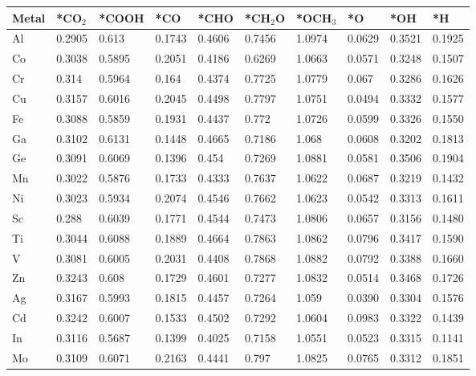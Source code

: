 \begin{table}[h]
  \centering
  {\fontsize{6}{12}\selectfont
  \begin{tabular}{*{10}{l}}
    \hline
    Metal & *CO$_2$ & *COOH & *CO & *CHO   & *CH$_2$O & *OCH$_3$ & *O & *OH    & *H     \\
    \hline
    Al & 0.2905 & 0.613  & 0.1743 & 0.4606 & 0.7456 & 1.0974 & 0.0629 & 0.3521 & 0.1925 \\
    Co & 0.3038 & 0.5895 & 0.2051 & 0.4186 & 0.6269 & 1.0663 & 0.0571 & 0.3248 & 0.1507 \\
    Cr & 0.314  & 0.5964 & 0.164  & 0.4374 & 0.7725 & 1.0779 & 0.067  & 0.3286 & 0.1626 \\
    Cu & 0.3157 & 0.6016 & 0.2045 & 0.4498 & 0.7797 & 1.0751 & 0.0494 & 0.3332 & 0.1577 \\
    Fe & 0.3088 & 0.5859 & 0.1931 & 0.4437 & 0.772  & 1.0726 & 0.0599 & 0.3326 & 0.1550 \\
    Ga & 0.3102 & 0.6131 & 0.1448 & 0.4665 & 0.7186 & 1.068  & 0.0608 & 0.3202 & 0.1813 \\
    Ge & 0.3091 & 0.6069 & 0.1396 & 0.454  & 0.7269 & 1.0881 & 0.0581 & 0.3506 & 0.1904 \\
    Mn & 0.3022 & 0.5876 & 0.1733 & 0.4333 & 0.7637 & 1.0622 & 0.0687 & 0.3219 & 0.1432 \\
    Ni & 0.3023 & 0.5934 & 0.2074 & 0.4546 & 0.7662 & 1.0623 & 0.0542 & 0.3313 & 0.1611 \\
    Sc & 0.288  & 0.6039 & 0.1771 & 0.4544 & 0.7473 & 1.0806 & 0.0657 & 0.3156 & 0.1480 \\
    Ti & 0.3044 & 0.6088 & 0.1889 & 0.4664 & 0.7863 & 1.0862 & 0.0796 & 0.3417 & 0.1590 \\
    V  & 0.3081 & 0.6005 & 0.2031 & 0.4408 & 0.7868 & 1.0882 & 0.0792 & 0.3388 & 0.1660 \\
    Zn & 0.3243 & 0.608  & 0.1729 & 0.4601 & 0.7277 & 1.0832 & 0.0514 & 0.3468 & 0.1726 \\
    Ag & 0.3167 & 0.5993 & 0.1815 & 0.4457 & 0.7264 & 1.059  & 0.0390 & 0.3304 & 0.1576 \\
    Cd & 0.3242 & 0.6007 & 0.1533 & 0.4502 & 0.7292 & 1.0604 & 0.0983 & 0.3322 & 0.1439 \\
    In & 0.3116 & 0.5687 & 0.1399 & 0.4025 & 0.7158 & 1.0551 & 0.0523 & 0.3315 & 0.1141 \\
    Mo & 0.3109 & 0.6071 & 0.2163 & 0.4441 & 0.797  & 1.0825 & 0.0765 & 0.3312 & 0.1851 \\

\end{tabular}}
\end{table}
